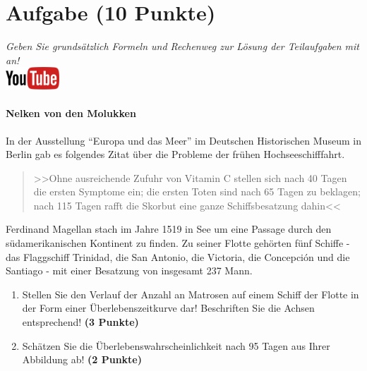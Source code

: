 \documentclass[a4paper, 10pt]{scrartcl}\usepackage[]{graphicx}\usepackage[]{xcolor}
\begin{document}
 
\clearpage

\section{Aufgabe \hfill (10 Punkte)}

\textit{Geben Sie grunds{\"a}tzlich Formeln und Rechenweg zur L{\"o}sung der
  Teilaufgaben mit an!} \\[1Ex]

\hfill\href{https://youtu.be/1B53cVFIU7Q}{\includegraphics[width =
  2cm]{img/youtube}} %
\hspace{2Ex}

\paragraph{Nelken von den Molukken}



In der Ausstellung "`Europa und das Meer"' im Deutschen Historischen Museum in
Berlin gab es folgendes Zitat {\"u}ber die Probleme der fr{\"u}hen Hochseeschifffahrt.

\begin{quote}
  >>Ohne ausreichende Zufuhr von Vitamin C stellen sich nach 40 Tagen die
  ersten Symptome ein; die ersten Toten sind nach 65 Tagen zu beklagen;
  nach 115 Tagen rafft die Skorbut eine ganze Schiffsbesatzung dahin<<
\end{quote}

Ferdinand Magellan stach im Jahre 1519 in See um eine Passage durch den
s{\"u}damerikanischen Kontinent zu finden. Zu seiner Flotte geh{\"o}rten
f{\"u}nf Schiffe - das Flaggschiff Trinidad, die San Antonio, die Victoria, die
Concepci{\'o}n und die Santiago - mit einer Besatzung von insgesamt
237 Mann. 

\begin{enumerate}
\item Stellen Sie den Verlauf der Anzahl an Matrosen auf einem Schiff der
  Flotte in der Form einer {\"U}berlebenszeitkurve dar! Beschriften Sie die
  Achsen entsprechend! \textbf{(3 Punkte)} 
\item Sch{\"a}tzen Sie die {\"U}berlebenswahrscheinlichkeit nach 95 Tagen
  aus Ihrer Abbildung ab! \textbf{(2 Punkte)} 
\end{enumerate}
\end{document}
